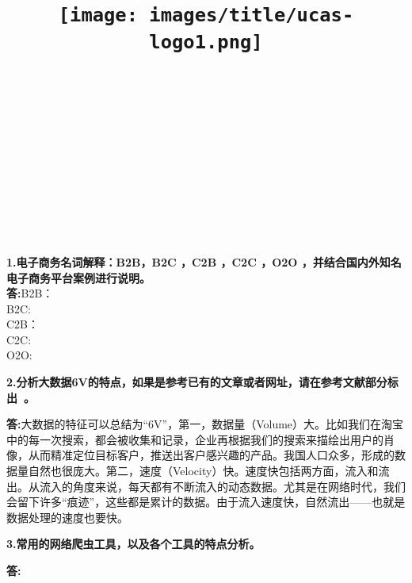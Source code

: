 \documentclass{article}
\title{
	\texttt{[image: images/title/ucas-logo1.png]}\\
    \vspace{1in}
    \textmd{\textbf{\hmwkClass\ \hmwkTitle}}\\
    \textmd{\textbf{\hmwkSubTitle}}\\
    \normalsize\vspace{0.1in}\small{\hmwkCompleteTime }\\
    \vspace{0.1in}\large{\textit{\hmwkClassInstructor\ }}\\
    \vspace{3in}
}
\author{\hmwkAuthorName \\ 
	\hmwkAuthorStuID}
\date{}
\begin{document}
\maketitle


%


\pagebreak

\begin{homeworkProblem}
\textbf{1.电子商务名词解释：B2B，B2C ，C2B ，C2C ，O2O ，并结合国内外知名电子商务平台案例进行说明。}\\
	{\color{blue}\textbf{答:}B2B：\\
	\qquad B2C:\\
\qquad	C2B：\\
\qquad	C2C:\\
\qquad	O2O:\\
	}
\end{homeworkProblem}


\begin{homeworkProblem}
	\textbf{2.分析大数据6V的特点，如果是参考已有的文章或者网址，请在参考文献部分标出~\cite{zhu}。}\\
{\color{blue}\textbf{答:}大数据的特征可以总结为“6V”，第一，数据量（Volume）大。比如我们在淘宝中的每一次搜索，都会被收集和记录，企业再根据我们的搜索来描绘出用户的肖像，从而精准定位目标客户，推送出客户感兴趣的产品。我国人口众多，形成的数据量自然也很庞大。第二，速度（Velocity）快。速度快包括两方面，流入和流出。从流入的角度来说，每天都有不断流入的动态数据。尤其是在网络时代，我们会留下许多“痕迹”，这些都是累计的数据。由于流入速度快，自然流出——也就是数据处理的速度也要快。

}
	
\end{homeworkProblem}


\pagebreak

\begin{homeworkProblem}
\textbf{3.常用的网络爬虫工具，以及各个工具的特点分析。}\\
{\color{blue}\textbf{答:}

}


\end{homeworkProblem}





\end{document}
